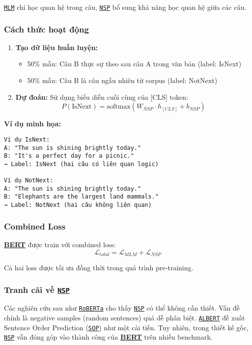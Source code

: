\hyperref[acro:mlm]{\texttt{MLM}} chỉ học quan hệ trong câu, \hyperref[acro:nsp]{\texttt{NSP}} bổ sung khả năng học quan hệ giữa các câu.

\subsubsection{Cách thức hoạt động}
\begin{enumerate}
    \item \textbf{Tạo dữ liệu huấn luyện:}
    \begin{itemize}
        \item 50\% mẫu: Câu B thực sự theo sau câu A trong văn bản (label: IsNext)
        \item 50\% mẫu: Câu B là câu ngẫu nhiên từ corpus (label: NotNext)
    \end{itemize}
    
    \item \textbf{Dự đoán:} Sử dụng biểu diễn cuối cùng của [CLS] token:
    \begin{equation}
    P(\text{IsNext}) = \text{softmax}(W_{NSP} \cdot h_{[CLS]} + b_{NSP})
    \label{eq:nsp_prediction}
    \end{equation}
\end{enumerate}

\textbf{Ví dụ minh họa:}
\begin{verbatim}
Ví dụ IsNext:
A: "The sun is shining brightly today."
B: "It's a perfect day for a picnic."
→ Label: IsNext (hai câu có liên quan logic)

Ví dụ NotNext:
A: "The sun is shining brightly today."
B: "Elephants are the largest land mammals."
→ Label: NotNext (hai câu không liên quan)
\end{verbatim}

\subsubsection{Combined Loss}
\hyperref[acro:bert]{\textbf{BERT}} được train với combined loss:
\begin{equation}
\mathcal{L}_{total} = \mathcal{L}_{MLM} + \mathcal{L}_{NSP}
\label{eq:combined_loss}
\end{equation}

Cả hai loss được tối ưu đồng thời trong quá trình pre-training.

\subsubsection{Tranh cãi về \hyperref[acro:nsp]{\texttt{NSP}}}
Các nghiên cứu sau như \hyperref[acro:roberta]{\texttt{RoBERTa}} \cite{liu2019roberta} cho thấy \hyperref[acro:nsp]{\texttt{NSP}} có thể không cần thiết. Vấn đề chính là negative samples (random sentences) quá dễ phân biệt. \hyperref[acro:albert]{\texttt{ALBERT}} \cite{lan2019albert} đề xuất Sentence Order Prediction (\hyperref[acro:sop]{\texttt{SOP}}) như một cải tiến. Tuy nhiên, trong thiết kế gốc, \hyperref[acro:nsp]{\texttt{NSP}} vẫn đóng góp vào thành công của \hyperref[acro:bert]{\textbf{BERT}} trên nhiều benchmark.

